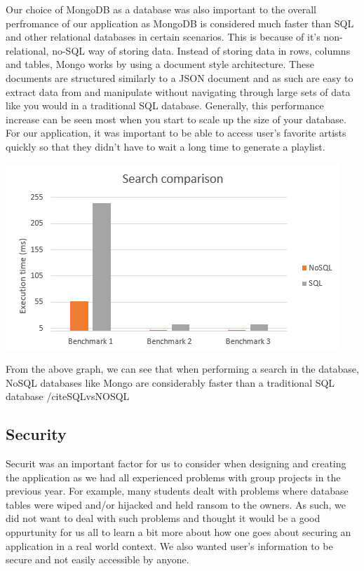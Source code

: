     Our choice of MongoDB as a database was also important to the overall perfromance of our application as MongoDB is considered much faster than SQL and other relational databases in certain scenarios. This is because of it's non-relational, no-SQL way of storing data.
    Instead of storing data in rows, columns and tables, Mongo works by using a document style architecture. These documents are structured similarly to a JSON document and as such are easy to extract data from and manipulate without navigating through 
    large sets of data like you would in a traditional SQL database. Generally, this performance increase can be seen most when you start to scale up the size of your database. For our application, it was important to be able to access user's favorite artists
    quickly so that they didn't have to wait a long time to generate a playlist.  

    \begin{center}    
      \includegraphics{img/SQLvsNOSQL.png}
    \end{center}

    From the above graph, we can see that when performing a search in the database, NoSQL databases like Mongo are considerably faster than a traditional SQL database /cite{SQLvsNOSQL}

    \subsection{Security}
    Securit was an important factor for us to consider when designing and creating the application as we had all experienced problems with group projects in the previous year. For example, many students dealt with problems where database tables were wiped and/or hijacked and held ransom
    to the owners. As such, we did not want to deal with such problems and thought it would be a good oppurtunity for us all to learn a bit more about how one goes about securing an application in a real world context. We also wanted user's information to be secure and not easily accessible by anyone.
    
